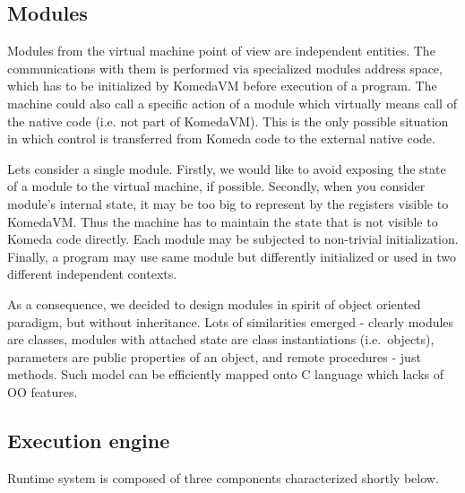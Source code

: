 \documentclass{article}
\begin{document}
\subsection{Modules}

Modules from the virtual machine point of view are  independent entities. The
communications with them is performed via specialized modules address space,
which has to be initialized by KomedaVM before execution of a program. The
machine could also call a specific action of a module which virtually means
call of the native code (i.e. not part of KomedaVM). This is the only possible
situation in which control is transferred from Komeda code to the external
native code.

Lets consider a single module. Firstly, we would like to avoid exposing the
state of a module to the virtual machine, if possible. Secondly, when you
consider module's internal state, it may be too big to represent by the
registers visible to KomedaVM. Thus the machine has to maintain the state that
is not visible to Komeda code directly. Each module may be subjected to
non-trivial initialization. Finally, a program may use same module but
differently initialized or used in two different independent contexts.

As a consequence, we decided to design modules in spirit of object oriented
paradigm, but without inheritance. Lots of similarities emerged - clearly
modules are classes, modules with attached state are class instantiations
(i.e.~objects), parameters are public properties of an object, and remote
procedures - just methods. Such model can be efficiently mapped onto C language
which lacks of OO features.

\subsection{Execution engine}

Runtime system is composed of three components characterized shortly below.
\end{document}
